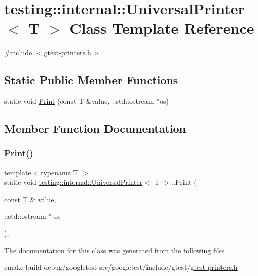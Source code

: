\hypertarget{classtesting_1_1internal_1_1UniversalPrinter}{}\section{testing\+::internal\+::Universal\+Printer$<$ T $>$ Class Template Reference}
\label{classtesting_1_1internal_1_1UniversalPrinter}


{\ttfamily \#include $<$gtest-\/printers.\+h$>$}

\subsection*{Static Public Member Functions}
\begin{DoxyCompactItemize}
\item 
static void \mbox{\hyperlink{classtesting_1_1internal_1_1UniversalPrinter_aecec021e1abbaa260b701e24e3fe33eb}{Print}} (const T \&value, \+::std\+::ostream $\ast$os)
\end{DoxyCompactItemize}


\subsection{Member Function Documentation}
\mbox{\label{classtesting_1_1internal_1_1UniversalPrinter_aecec021e1abbaa260b701e24e3fe33eb}} 
\subsubsection{\texorpdfstring{Print()}{Print()}}
{\footnotesize\ttfamily template$<$typename T $>$ \\
static void \mbox{\hyperlink{classtesting_1_1internal_1_1UniversalPrinter}{testing\+::internal\+::\+Universal\+Printer}}$<$ T $>$\+::Print (\begin{DoxyParamCaption}\item[{const T \&}]{value,  }\item[{\+::std\+::ostream $\ast$}]{os }\end{DoxyParamCaption})\hspace{0.3cm}{\ttfamily [inline]}, {\ttfamily [static]}}



The documentation for this class was generated from the following file\+:\begin{DoxyCompactItemize}
\item 
cmake-\/build-\/debug/googletest-\/src/googletest/include/gtest/\mbox{\hyperlink{gtest-printers_8h}{gtest-\/printers.\+h}}\end{DoxyCompactItemize}

